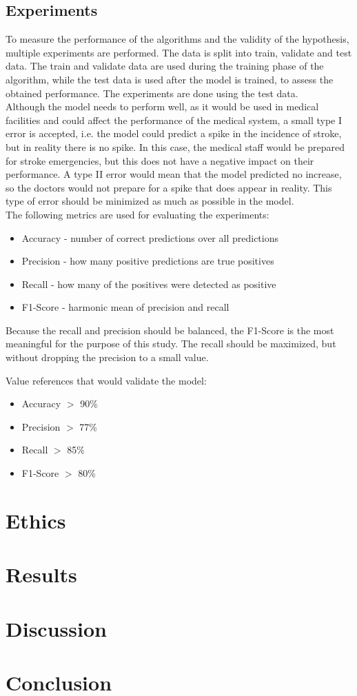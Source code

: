 \documentclass{article}
\begin{document}
\newpage
\subsection{Experiments}

To measure the performance of the algorithms and the validity of the hypothesis, multiple experiments are performed. The data is split into train, validate and test data. The train and validate data are used during the training phase of the algorithm, while the test data is used after the model is trained, to assess the obtained performance. The experiments are done using the test data. 
\\

Although the model needs to perform well, as it would be used in medical facilities and could affect the performance of the medical system, a small type I error is accepted, i.e. the model could predict a spike in the incidence of stroke, but in reality there is no spike. In this case, the medical staff would be prepared for stroke emergencies, but this does not have a negative impact on their performance. A type II error would mean that the model predicted no increase, so the doctors would not prepare for a spike that does appear in reality. This type of error should be minimized as much as possible in the model.
\\

The following metrics are used for evaluating the experiments:
\begin{itemize}
    \item Accuracy - number of correct predictions over all predictions
    \item Precision - how many positive predictions are true positives
    \item Recall - how many of the positives were detected as positive
    \item F1-Score - harmonic mean of precision and recall
\end{itemize}
Because the recall and precision should be balanced, the F1-Score is the most meaningful for the purpose of this study. The recall should be maximized, but without dropping the precision to a small value.

Value references that would validate the model:
\begin{itemize}
    \item Accuracy $>$ 90\%
    \item Precision $>$ 77\%
    \item Recall $>$ 85\%
    \item F1-Score $>$ 80\%
\end{itemize}
\newpage
\section{Ethics}
\section{Results}
\section{Discussion}
\section{Conclusion}
\newpage

\nocite{*}
\medskip
\begin{multicols}{2}
\printbibliography[heading=bibintoc]
\end{multicols}
\end{document}

